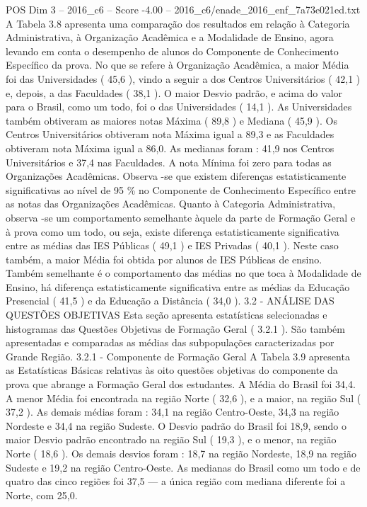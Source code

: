 \begin{textsample}{POS Dim 3 – 2016\_c6 – Score -4.00 – 2016\_c6/enade\_2016\_enf\_7a73e021ed.txt}
A Tabela 3.8 apresenta uma comparação dos resultados em relação à Categoria Administrativa, à Organização Acadêmica e a Modalidade de Ensino, agora levando em conta o desempenho de alunos do Componente de Conhecimento Específico da prova.
No que se refere à Organização Acadêmica, a maior Média foi das Universidades ( 45,6 ), vindo a seguir a dos Centros Universitários ( 42,1 ) e, depois, a das Faculdades ( 38,1 ).
O maior Desvio padrão, e acima do valor para o Brasil, como um todo, foi o das Universidades ( 14,1 ).
As Universidades também obtiveram as maiores notas Máxima ( 89,8 ) e Mediana ( 45,9 ).
Os Centros Universitários obtiveram nota Máxima igual a 89,3 e as Faculdades obtiveram nota Máxima igual a 86,0.
As medianas foram : 41,9 nos Centros Universitários e 37,4 nas Faculdades.
A nota Mínima foi zero para todas as Organizações Acadêmicas.
Observa -se que existem diferenças estatisticamente significativas ao nível de 95 \% no Componente de Conhecimento Específico entre as notas das Organizações Acadêmicas.
Quanto à Categoria Administrativa, observa -se um comportamento semelhante àquele da parte de Formação Geral e à prova como um todo, ou seja, existe diferença estatisticamente significativa entre as médias das IES Públicas ( 49,1 ) e IES Privadas ( 40,1 ).
Neste caso também, a maior Média foi obtida por alunos de IES Públicas de ensino.
Também semelhante é o comportamento das médias no que toca à Modalidade de Ensino, há diferença estatisticamente significativa entre as médias da Educação Presencial ( 41,5 ) e da Educação a Distância ( 34,0 ). 3.2 - ANÁLISE DAS QUESTÕES OBJETIVAS Esta seção apresenta estatísticas selecionadas e histogramas das Questões Objetivas de Formação Geral ( 3.2.1 ).
São também apresentadas e comparadas as médias das subpopulações caracterizadas por Grande Região. 3.2.1 - Componente de Formação Geral A Tabela 3.9 apresenta as Estatísticas Básicas relativas às oito questões objetivas do componente da prova que abrange a Formação Geral dos estudantes.
A Média do Brasil foi 34,4.
A menor Média foi encontrada na região Norte ( 32,6 ), e a maior, na região Sul ( 37,2 ).
As demais médias foram : 34,1 na região Centro-Oeste, 34,3 na região Nordeste e 34,4 na região Sudeste.
O Desvio padrão do Brasil foi 18,9, sendo o maior Desvio padrão encontrado na região Sul ( 19,3 ), e o menor, na região Norte ( 18,6 ).
Os demais desvios foram : 18,7 na região Nordeste, 18,9 na região Sudeste e 19,2 na região Centro-Oeste.
As medianas do Brasil como um todo e de quatro das cinco regiões foi 37,5 — a única região com mediana diferente foi a Norte, com 25,0.

\end{textsample}
